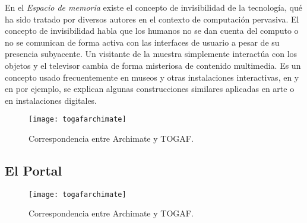 En el \textit{Espacio de memoria} existe el concepto de invisibilidad de la tecnología\cite{RN13,weiser1991computer,RN23,RN14}, qué ha sido tratado por diversos autores en el contexto de computación pervasiva. El concepto de invisibilidad habla que los humanos no se dan cuenta del computo o no se comunican de forma activa con las interfaces de usuario a pesar de su presencia subyacente. Un visitante de la muestra simplemente interactúa con los objetos y el televisor cambia de forma misteriosa de contenido multimedia. Es un concepto usado frecuentemente en museos y otras instalaciones interactivas, en \cite{RN31} y en \cite{RN34} por ejemplo, se explican algunas construcciones similares aplicadas en arte o en instalaciones digitales. 

\begin{figure}[h]\label{togafarchimate}
\centering
\texttt{[image: togafarchimate]}
\caption{Correspondencia entre Archimate y TOGAF.}
\end{figure}

\subsection{El Portal}

\begin{figure}[h]\label{togafarchimate}
\centering
\texttt{[image: togafarchimate]}
\caption{Correspondencia entre Archimate y TOGAF.}
\end{figure}